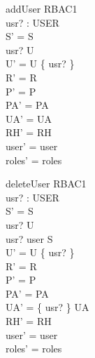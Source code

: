 \begin{zedgroup}
  \begin{schema}{addUser}
    \Delta RBAC1\\
    usr? : USER\\
    \where
    S' = S\\
    usr? \notin U\\
    U' = U \cup \{ usr? \}\\
    R' = R\\
    P' = P\\
    PA' = PA\\
    UA' = UA\\
    RH' = RH\\
    user' = user\\
    roles' = roles\\
  \end{schema}
  \begin{schema}{deleteUser}
    \Delta RBAC1\\
    usr? : USER\\
    \where
    S' = S\\
    usr? \in U\\
    usr? \notin user \limg S \rimg\\
    U' = U \setminus \{ usr? \}\\
    R' = R\\
    P' = P\\
    PA' = PA\\
    UA' = \{ usr? \} \ndres UA\\
    RH' = RH\\
    user' = user\\
    roles' = roles\\
  \end{schema}
\end{zedgroup}  


